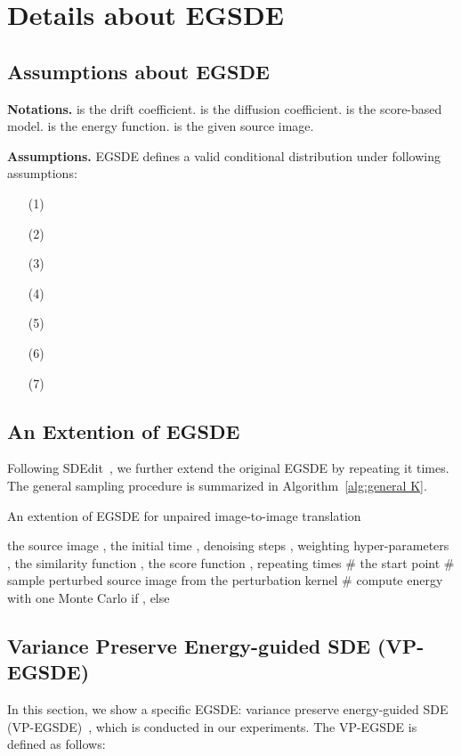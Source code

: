 \documentclass{article}
\begin{document}
\clearpage
\appendix


\section{Details about EGSDE}
\subsection{Assumptions about EGSDE}
\label{assumptions}
\textbf{Notations.}  is the drift coefficient.  is the diffusion coefficient.   is the score-based model.  is the energy function.  is the given source image. 

\textbf{Assumptions.} EGSDE defines a valid conditional distribution  under following assumptions: 
\begin{itemize}
  \item [(1)] 
  \item [(2)]
  \item [(3)] 
  \item [(4)] 
  \item [(5)] 
   \item [(6)] 
   \item [(7)]
\end{itemize}
\subsection{An Extention of EGSDE}
\label{sec:K}
Following SDEdit~\cite{meng2021sdedit}, we further extend the original EGSDE by repeating it  times. The general sampling procedure is summarized in Algorithm~{\ref{alg:general K}}.
\begin{algorithm}
    \caption{An extention of EGSDE for unpaired image-to-image translation}
    \label{alg:general K}
    \begin{algorithmic}
        \REQUIRE the source image , the initial time , denoising steps , weighting hyper-parameters , the similarity function , the score function , repeating times  
        \STATE 
        \STATE 
        \STATE  \# the start point
        \STATE 
        \STATE  \# sample perturbed source image from the perturbation kernel
        \STATE  \# compute energy with one Monte Carlo
        \STATE  
        \STATE  if , else 
        \STATE 
    \ENDFOR
    \STATE 
    \ENDFOR
    \STATE 
    \RETURN 
    \end{algorithmic}
\end{algorithm}
\subsection{Variance Preserve Energy-guided SDE (VP-EGSDE)}
\label{sec:VP-EGSDE}
In this section, we show a specific EGSDE: variance preserve energy-guided SDE (VP-EGSDE)~\cite{song2020score,ho2020denoising}, which is conducted in our experiments. The VP-EGSDE is defined as follows:
\end{document}
